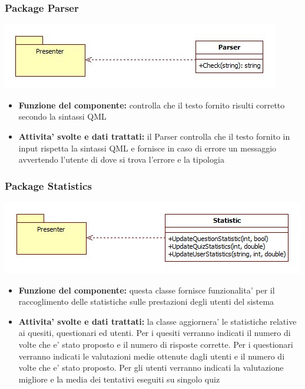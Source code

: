 			\subsubsection{Package Parser}
			\begin{center}
				\includegraphics[scale=0.6]{../images/Parser.jpg}
			\end{center}
 			\begin{itemize}
		    	\item\textbf{Funzione del componente:} controlla che il testo fornito risulti corretto secondo la sintassi QML
			\item\textbf{Attivita' svolte e dati trattati:} il Parser controlla che il testo fornito in input rispetta la sintassi QML e fornisce in caso di errore un messaggio avvertendo l'utente di dove si trova l'errore e la tipologia
			\end{itemize}
			
			\subsubsection{Package Statistics}
			\begin{center}
				\includegraphics[scale=0.6]{../images/Statistics.jpg}
			\end{center}
 			\begin{itemize}
		    	\item\textbf{Funzione del componente:} questa classe fornisce funzionalita' per il raccoglimento delle statistiche sulle prestazioni degli utenti del sistema
			\item\textbf{Attivita' svolte e dati trattati:} la classe aggiornera' le statistiche relative ai quesiti, questionari ed utenti.
			Per i quesiti verranno indicati il numero di volte che e' stato proposto e il numero di risposte corrette.
			Per i questionari verranno indicati le valutazioni medie ottenute dagli utenti e il numero di volte che e' stato proposto.
			Per gli utenti verranno indicati la valutazione migliore e la media dei tentativi eseguiti su singolo quiz
			\end{itemize}
			
